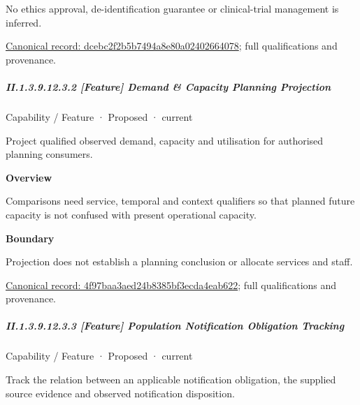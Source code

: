 No ethics approval, de-identification guarantee or clinical-trial management is inferred.


{\footnotesize \href{../../../../continuum/strategy/capability/feature/dcebc2f2b5b7494a8e80a02402664078.md}{Canonical record: dcebc2f2b5b7494a8e80a02402664078}; full qualifications and provenance.}\par
\subparagraph*{II.1.3.9.12.3.2 [Feature] Demand \& Capacity Planning Projection}
\label{navigation:II.1.3.9.12.3.2}

\label{element:4f97baa3aed24b8385bf3ecda4eab622}
{\small Capability / Feature · Proposed · current}\par

Project qualified observed demand, capacity and utilisation for authorised planning consumers.



\textbf{Overview}



Comparisons need service, temporal and context qualifiers so that planned future capacity is not confused with present operational capacity.



\textbf{Boundary}



Projection does not establish a planning conclusion or allocate services and staff.


{\footnotesize \href{../../../../continuum/strategy/capability/feature/4f97baa3aed24b8385bf3ecda4eab622.md}{Canonical record: 4f97baa3aed24b8385bf3ecda4eab622}; full qualifications and provenance.}\par
\subparagraph*{II.1.3.9.12.3.3 [Feature] Population Notification Obligation Tracking}
\label{navigation:II.1.3.9.12.3.3}

\label{element:62f6a91a10684876b7d08b536700f12f}
{\small Capability / Feature · Proposed · current}\par

Track the relation between an applicable notification obligation, the supplied source evidence and observed notification disposition.



